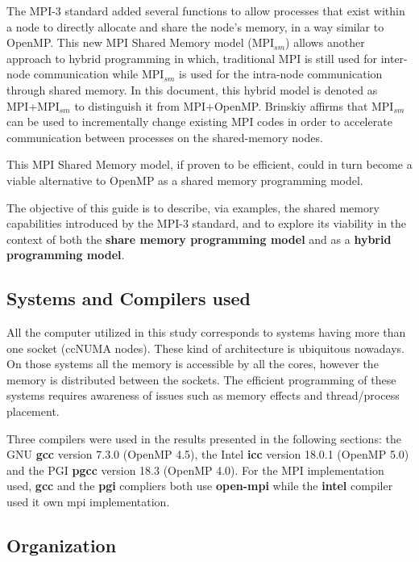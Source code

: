 \medskip

The MPI-3 standard added several functions to allow processes that exist within a node to directly allocate and share the node's memory, in a way similar to OpenMP. This new MPI Shared Memory model (MPI$_{sm}$) allows another approach to hybrid programming in which, traditional MPI is still used for inter-node communication while MPI$_{sm}$ is used for the intra-node communication through shared memory. In this document, this hybrid model is denoted as MPI+MPI$_{sm}$ to distinguish it from MPI+OpenMP. Brinskiy\cite{brinskiy2015} affirms that MPI$_{sm}$ can be used to incrementally change existing MPI codes in order to accelerate communication between processes on the shared-memory nodes.

\medskip

This MPI Shared Memory model, if proven to be efficient, could in turn become a viable alternative to OpenMP as a shared memory programming model.
 
\medskip

The objective of this guide is to describe, via examples, the shared memory capabilities introduced by the MPI-3 standard, and to explore its viability in the context of both the \textbf{share memory programming model} and as a \textbf{hybrid programming model}.


\subsection*{Systems and Compilers used}

All the computer utilized in this study corresponds to systems having more than one socket (ccNUMA nodes). These kind of architecture is ubiquitous nowadays. On those systems all the memory is accessible by all the cores, however the memory is distributed between the sockets. The efficient programming of these systems requires awareness of issues such as memory effects and thread/process placement.


Three compilers were used in the results presented in the following sections: the GNU \textbf{gcc}  version 7.3.0 (OpenMP 4.5), the Intel \textbf{icc} version 18.0.1 (OpenMP 5.0) and the  PGI \textbf{pgcc} version 18.3 (OpenMP 4.0). For the MPI implementation used, \textbf{gcc} and the \textbf{pgi} compliers both use \textbf{open-mpi} while the \textbf{intel} compiler used it own mpi implementation.



\subsection*{Organization}


